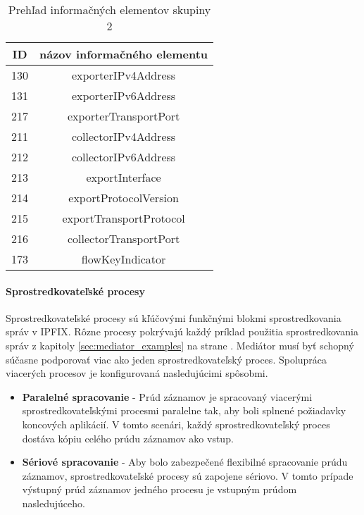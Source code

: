 \tabcolsep=8pt
\begin{table}[!ht]\caption{Prehľad informačných elementov skupiny 2}\label{t:ie-group2}
\smallskip
\centering
\begin{tabular}{|c|c|}
\hline
\textbf{ID} & \textbf{názov informačného elementu} \\ \hline
130 & exporterIPv4Address \\ \hline
131 & exporterIPv6Address \\ \hline
217 & exporterTransportPort \\ \hline
211 & collectorIPv4Address \\ \hline
212 & collectorIPv6Address \\ \hline
213 & exportInterface \\ \hline
214 & exportProtocolVersion \\ \hline
215 & exportTransportProtocol \\ \hline
216 & collectorTransportPort \\ \hline
173 & flowKeyIndicator \\ \hline
\end{tabular}
\end{table}

\paragraph{Sprostredkovateľské procesy} \label{sec:framework_intermediate}

Sprostredkovateľské procesy sú kľúčovými funkčnými blokmi sprostredkovania správ v IPFIX. Rôzne procesy 
pokrývajú každý príklad použitia sprostredkovania správ z kapitoly \ref{sec:mediator_examples} na strane 
\pageref{sec:mediator_examples}. 
Mediátor musí byť schopný súčasne podporovať viac ako jeden sprostredkovateľský proces. Spolupráca viacerých 
procesov je konfigurovaná nasledujúcimi spôsobmi.

\begin{itemize}
 \item \textbf{Paralelné spracovanie} - Prúd záznamov je spracovaný viacerými sprostredkovateľskými procesmi 
 paralelne tak, aby boli splnené požiadavky koncových aplikácií. V tomto scenári, každý 
 sprostredkovateľský proces dostáva kópiu celého prúdu záznamov ako vstup.
 \item \textbf{Sériové spracovanie} - Aby bolo zabezpečené flexibilné spracovanie prúdu záznamov, sprostredkovateľské
 procesy sú zapojene sériovo. V tomto prípade výstupný prúd záznamov jedného procesu je vstupným prúdom 
 nasledujúceho.
\end{itemize}






















